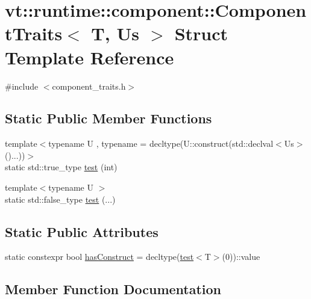 \hypertarget{structvt_1_1runtime_1_1component_1_1_component_traits}{}\section{vt\+:\+:runtime\+:\+:component\+:\+:Component\+Traits$<$ T, Us $>$ Struct Template Reference}
\label{structvt_1_1runtime_1_1component_1_1_component_traits}


{\ttfamily \#include $<$component\+\_\+traits.\+h$>$}

\subsection*{Static Public Member Functions}
\begin{DoxyCompactItemize}
\item 
{\footnotesize template$<$typename U , typename  = decltype(\+U\+::construct(std\+::declval$<$\+Us$>$()...))$>$ }\\static std\+::true\+\_\+type \hyperlink{structvt_1_1runtime_1_1component_1_1_component_traits_ae584f4350bc47282eb63d96c5120f81b}{test} (int)
\item 
{\footnotesize template$<$typename U $>$ }\\static std\+::false\+\_\+type \hyperlink{structvt_1_1runtime_1_1component_1_1_component_traits_addeae37e194545ea033a64a61ff646c9}{test} (...)
\end{DoxyCompactItemize}
\subsection*{Static Public Attributes}
\begin{DoxyCompactItemize}
\item 
static constexpr bool \hyperlink{structvt_1_1runtime_1_1component_1_1_component_traits_af0ab616ad3c6a062e23aac0332cb6e69}{has\+Construct} = decltype(\hyperlink{structvt_1_1runtime_1_1component_1_1_component_traits_ae584f4350bc47282eb63d96c5120f81b}{test}$<$T$>$(0))\+::value
\end{DoxyCompactItemize}


\subsection{Member Function Documentation}
\mbox{\label{structvt_1_1runtime_1_1component_1_1_component_traits_ae584f4350bc47282eb63d96c5120f81b}} 
